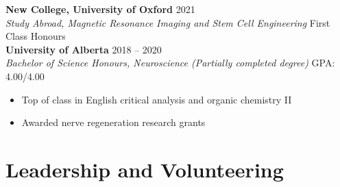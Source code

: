 \documentclass{article}
\begin{document}
\textbf{New College, University of Oxford} \hfill 2021 \\
\textit{Study Abroad, Magnetic Resonance Imaging and Stem Cell Engineering} \hfill First Class Honours \\

\textbf{University of Alberta} \hfill 2018 -- 2020 \\
\textit{Bachelor of Science Honours, Neuroscience (Partially completed degree)} \hfill GPA: 4.00/4.00
\begin{itemize}
    \item Top of class in English critical analysis and organic chemistry II
    \item Awarded nerve regeneration research grants
\end{itemize}


\section*{\textcolor{my_colour}{Leadership and Volunteering}}
\vspace{-.25em} \hrulefill \vspace{.25em}
\end{document}
